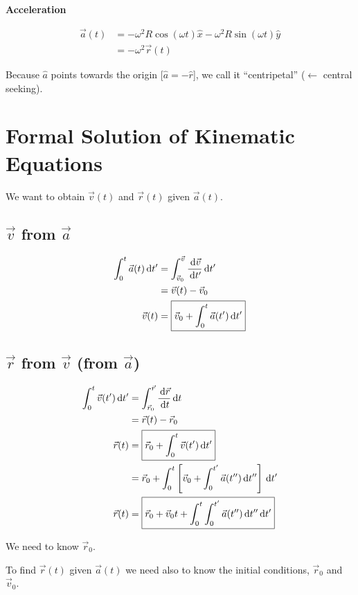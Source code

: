 \begin{sol}
	\textbf{Acceleration}

	\begin{align}
		\vec a(t) &= -\omega^2 R \cos(\omega t) \hat x - \omega^2 R \sin(\omega t) \hat y\\
		&= -\omega^2 \vec r(t)
	\end{align}

	\begin{remark}
		Because $\hat a$ points towards the origin [$\hat a = - \hat r$], we call it ``centripetal'' ($\leftarrow$ central seeking).
	\end{remark}
\end{sol}

\section{Formal Solution of Kinematic Equations}

We want to obtain $\vec v(t)$ and $\vec r(t)$ given $\vec a(t)$.

\subsection{$\vec v$ from $\vec a$}

\begin{align}
	\int_0^t \vec a(t) \D t' &= \int_{\vec v_0}^{\vec v} \frac{\D \vec v}{\D t'} \D t'\\
	&= \vec v(t) - \vec v_0\\
	\vec v(t) &= \boxed{\vec v_0 + \int_0^t \vec a(t') \D t'}
\end{align}

\subsection{$\vec r$ from $\vec v$ (from $\vec a$)}

\begin{align}
	\int_0^t \vec v(t') \D t' &= \int_{\vec r_0}^{\vec r} \frac{\D \vec r}{\D t} \D t\\
	&= \vec r(t) - \vec r_0\\
	\vec r(t) &= \boxed{\vec r_0 + \int_0^t \vec v(t') \D t'}\\
	&= \vec r_0 + \int_0^t \left[\vec v_0 + \int_0^{t'} \vec a(t'') \D t''\right] \D t'\\
	\vec r(t) &= \boxed{\vec r_0 + \vec v_0 t + \int_0^t \int_0^{t'} \vec a(t'') \D t'' \D t'}
\end{align}

\begin{remark}
	We need to know $\vec r_0$.

	To find $\vec r(t)$ given $\vec a(t)$ we need also to know the initial conditions, $\vec r_0$ and $\vec v_0$.
\end{remark}

